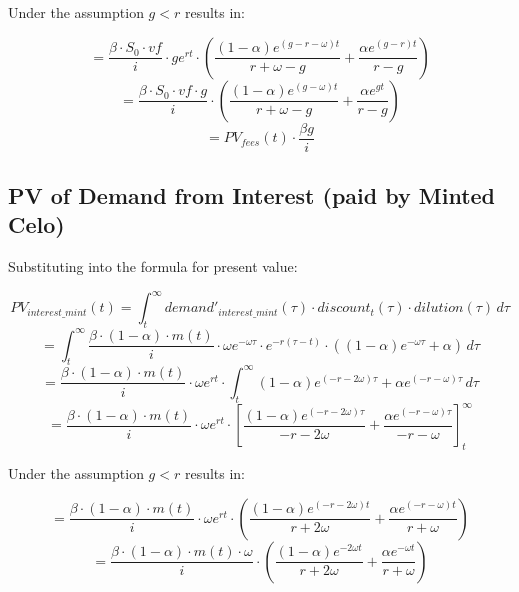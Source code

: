 Under the assumption $g < r$ results in:

\begin{equation}
    = \frac{\beta \cdot S_0\cdot vf}{i} \cdot ge^{rt} \cdot \left( \frac{(1-\alpha)e^{(g-r-\omega)t}}{r+\omega-g} + \frac{\alpha e^{(g-r)t}}{r-g} \right)
\end{equation}
\begin{equation}
    = \frac{\beta \cdot S_0\cdot vf \cdot g}{i} \cdot \left( \frac{(1-\alpha)e^{(g-\omega)t}}{r+\omega-g} + \frac{\alpha e^{gt}}{r-g} \right)
\end{equation}
\begin{equation}
    = PV_{fees}(t) \cdot \frac{\beta g}{i}
\end{equation}


\subsection{PV of Demand from Interest (paid by Minted Celo)}

Substituting into the formula for present value:

\begin{equation}
    PV_{interest\_mint}(t) = \int_{t}^{\infty} demand'_{interest\_mint}(\tau) \cdot discount_t(\tau) \cdot dilution(\tau) \,d\tau
\end{equation}
\begin{equation}
    = \int_{t}^{\infty} \frac{\beta \cdot (1 - \alpha)\cdot m(t)}{i} \cdot \omega e^{-\omega\tau} \cdot e^{-r(\tau-t)} \cdot ((1-\alpha)e^{-\omega\tau} + \alpha) \,d\tau
\end{equation}
\begin{equation}
    = \frac{\beta \cdot (1 - \alpha)\cdot m(t)}{i} \cdot \omega e^{rt} \cdot \int_{t}^{\infty}  (1-\alpha)e^{(-r-2\omega)\tau} + \alpha e^{(-r-\omega)\tau} \,d\tau
\end{equation}
\begin{equation}
    = \frac{\beta \cdot (1 - \alpha)\cdot m(t)}{i} \cdot \omega e^{rt} \cdot \left[ \frac{(1-\alpha)e^{(-r-2\omega)\tau}}{-r-2\omega} + \frac{\alpha e^{(-r-\omega)\tau}}{-r-\omega} \right]_{t}^{\infty}
\end{equation}

Under the assumption $g < r$ results in:

\begin{equation}
    = \frac{\beta \cdot (1 - \alpha)\cdot m(t)}{i} \cdot \omega e^{rt} \cdot \left( \frac{(1-\alpha)e^{(-r-2\omega)t}}{r+2\omega} + \frac{\alpha e^{(-r-\omega)t}}{r+\omega} \right)
\end{equation}
\begin{equation}
    = \frac{\beta \cdot (1 - \alpha)\cdot m(t) \cdot \omega}{i} \cdot \left( \frac{(1-\alpha)e^{-2\omega t}}{r+2\omega} + \frac{\alpha e^{-\omega t}}{r+\omega} \right)
\end{equation}



